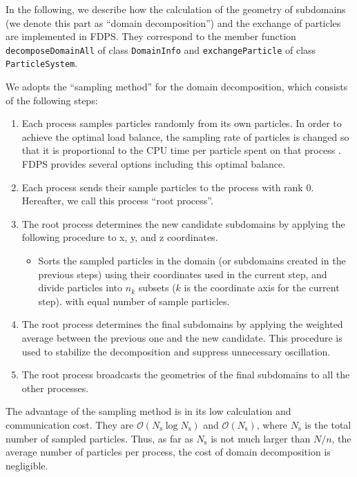 In the following, we describe how the calculation of the geometry of
subdomains (we denote this part as ``domain decomposition'') and the
exchange of particles are implemented in FDPS.  They correspond to the
member function \texttt{decomposeDomainAll} of class \texttt{DomainInfo} and
\texttt{exchangeParticle} of class \texttt{ParticleSystem}.

We adopts the ``sampling
method'' \cite{Blackston:1997:HPE:509593.509597} for the domain
decomposition, which consists of the following steps:
\begin{enumerate} 
\item Each process samples particles randomly from its own
  particles. In order to achieve the optimal load balance, the
  sampling rate of particles is changed so that it is proportional to
  the CPU time per particle spent on that
  process \cite{ishiyama:greem}. FDPS provides several options
  including this optimal balance. \label{proc:sampling}
\item Each process sends their sample particles to the process with
  rank 0. Hereafter, we call this process ``root
  process''. \label{proc:gathering}
\item The root process determines the new candidate subdomains  by
applying  the following procedure to x, y, and z coordinates.
 \label{proc:sorting}
  \begin{itemize}
  \item Sorts the sampled particles in the domain (or subdomains
    created in the previous steps) using 
    their coordinates used in the current step, 
    and divide particles into 
    $n_k$ subsets ($k$ is the coordinate axis for the current step).
    with equal number of sample particles.
  \end{itemize}
\item The root process determines the final subdomains by applying the
    weighted average between the previous one and the new candidate. This
    procedure is used to stabilize the decomposition and suppress
    unnecessary oscillation. \label{proc:moving}
\item The root process broadcasts the geometries of the final
    subdomains  to
  all the other processes. \label{proc:broadcasting}
\end{enumerate}

The advantage of the sampling method is in its low calculation and
communication cost. They are $\mathcal{O}(N_\mathrm{s} \log
N_\mathrm{s})$ and $\mathcal{O}(N_\mathrm{s} )$, where $N_\mathrm{s}$
is the total number of sampled particles. Thus, as far as
$N_\mathrm{s}$ is not much larger than $N/n$, the average number of
particles per process, the cost of domain decomposition is negligible.

